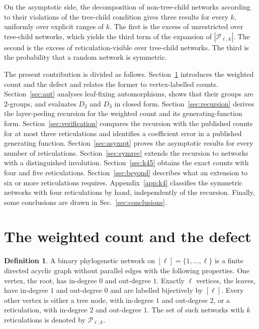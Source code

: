\documentclass[11pt,a4paper]{article}
\theoremstyle{definition}
\newtheorem{definition}[theorem]{Definition}
\newcommand{\cP}{\mathcal{P}}
\begin{document}
On the asymptotic side, the decomposition of non-tree-child networks according to their violations of the tree-child condition gives three results for every $k$, uniformly over explicit ranges of $k$. The first is the excess of unrestricted over tree-child networks, which yields the third term of the expansion of $|\cP_{\ell,k}|$. The second is the excess of reticulation-visible over tree-child networks. The third is the probability that a random network is symmetric.

The present contribution is divided as follows. Section~\ref{sec:weighted} introduces the weighted count and the defect and relates the former to vertex-labelled counts. Section~\ref{sec:aut} analyses leaf-fixing automorphisms, shows that their groups are $2$-groups, and evaluates $D_2$ and $D_3$ in closed form. Section~\ref{sec:recursion} derives the layer-peeling recursion for the weighted count and its generating-function form. Section~\ref{sec:verification} compares the recursion with the published counts for at most three reticulations and identifies a coefficient error in a published generating function. Section~\ref{sec:asympt} proves the asymptotic results for every number of reticulations. Section~\ref{sec:symrec} extends the recursion to networks with a distinguished involution. Section~\ref{sec:k45} obtains the exact counts with four and five reticulations. Section~\ref{sec:beyond} describes what an extension to six or more reticulations requires. Appendix~\ref{app:k4} classifies the symmetric networks with four reticulations by hand, independently of the recursion. Finally, some conclusions are drawn in Sec.~\ref{sec:conclusions}.



\section{The weighted count and the defect}\label{sec:weighted}

\begin{definition}\label{def:network}
A binary phylogenetic network on $[\ell]=\{1,\dots,\ell\}$ is a finite directed acyclic graph without parallel edges with the following properties. One vertex, the root, has in-degree $0$ and out-degree $1$. Exactly $\ell$ vertices, the leaves, have in-degree $1$ and out-degree $0$ and are labelled bijectively by $[\ell]$. Every other vertex is either a tree node, with in-degree $1$ and out-degree $2$, or a reticulation, with in-degree $2$ and out-degree $1$. The set of such networks with $k$ reticulations is denoted by $\cP_{\ell,k}$.
\end{definition}
\end{document}
